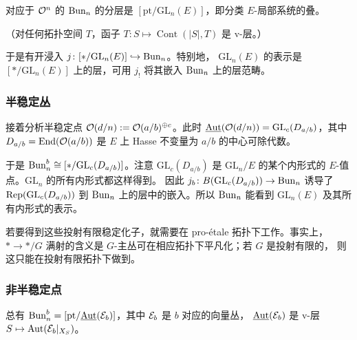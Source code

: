 \begin{corollary}
对应于 $\mathcal{O}^n$ 的 $\mathrm{Bun}_n$ 的分层是 $[\mathrm{pt}/\mathrm{GL}_n(E)]$，即分类
$E$-局部系统的叠。
\end{corollary}

（对任何拓扑空间 $T$，函子 $T\colon S\mapsto\operatorname{Cont}(|S|,T)$ 是 v-层。）

于是有开浸入 $j\colon[*/\mathrm{GL}_n(E)]\hookrightarrow\mathrm{Bun}_n$。特别地，
$\mathrm{GL}_n(E)$ 的表示是 $[*/\mathrm{GL}_n(E)]$ 上的层，可用 $j_!$ 将其嵌入
$\mathrm{Bun}_n$ 上的层范畴。

\subsubsection{半稳定丛}

接着分析半稳定点 $\mathcal{O}(d/n):=\mathcal{O}(a/b)^{\oplus c}$。此时
$\underline{\operatorname{Aut}}(\mathcal{O}(d/n))=\mathrm{GL}_c(D_{a/b})$，其中 $D_{a/b}=\operatorname{End}(\mathcal{O}(a/b))$ 是
$E$ 上 Hasse 不变量为 $a/b$ 的中心可除代数。

于是 $\mathrm{Bun}^b_n\cong[*/\mathrm{GL}_c(D_{a/b})]$。注意 $\mathrm{GL}_c(D_{a/b})$ 是
$\mathrm{GL}_n/E$ 的某个内形式的 $E$-值点。$\mathrm{GL}_n$ 的所有内形式都这样得到。
因此 $j_b\colon B(\mathrm{GL}_c(D_{a/b}))\to\mathrm{Bun}_n$ 诱导了
$\operatorname{Rep}(\mathrm{GL}_c(D_{a/b}))$ 到 $\mathrm{Bun}_n$ 上的层中的嵌入。所以 $\mathrm{Bun}_n$ 能看到
$\mathrm{GL}_n(E)$ 及其所有内形式的表示。

\begin{remark}
若要得到这些投射有限稳定化子，就需要在 pro-étale 拓扑下工作。事实上，
$\ast\to\ast/G$ 满射的含义是 $G$-主丛可在相应拓扑下平凡化；若 $G$ 是投射有限的，
则这只能在投射有限拓扑下做到。
\end{remark}

\subsubsection{非半稳定点}

总有 $\mathrm{Bun}^b_n=[\mathrm{pt}/\underline{\operatorname{Aut}}(\mathcal{E}_b)]$，其中 $\mathcal{E}_b$ 是 $b$ 对应的向量丛，
$\underline{\operatorname{Aut}}(\mathcal{E}_b)$ 是 v-层 $S\mapsto\operatorname{Aut}(\mathcal{E}_b|_{X_S})$。

